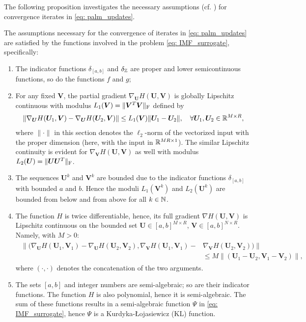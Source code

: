The following proposition investigates the necessary assumptions (cf. \cite[Asm. 1 and Asm. 2]{bolte2014proximal}) for convergence iterates in \eqref{eq: palm_updates}.
\begin{prop}\label{prop: assumptions}
    The assumptions necessary for the convergence of iterates in \eqref{eq: palm_updates} are satisfied by the functions involved in the problem \eqref{eq: IMF_surrogate}, specifically:
    \begin{enumerate}
        \item The indicator functions $\delta_{[a,b]}$ and $\delta_\mathbb Z$ are proper and lower semicontinuous functions, so do the functions $f$ and $g$;
        \item For any fixed $\bm V$, the partial gradient $\nabla_{\bm U} H(\bm U, \bm V)$ is globally Lipschitz continuous with modulus $L_1(\bm V) = \|\bm V^T \bm V\|_{\rm F}$ defined by
        \begin{equation*}
            \|\nabla_{\bm U} H(\bm U_1, \bm V) - \nabla_{\bm U} H(\bm U_2, \bm V)\| \leq L_1(\bm V) \|\bm U_1 - \bm U_2\|, \quad \forall \bm U_1,\bm U_2 \in \mathbb{R}^{M\times R},
        \end{equation*}
        where $\|\cdot\|$ in this section denotes the $\ell_2$-norm of the vectorized input with the proper dimension (here, with the input in $\mathbb{R}^{MR\times 1}$).
        The similar Lipschitz continuity is evident for $\nabla_{\bm V} H(\bm U, \bm V)$ as well with modulus $L_2(\bm U) = \|\bm U \bm U^T\|_{\rm F}$.
        \item The sequences $\bm U^k$ and $\bm V^k$ are bounded due to the indicator functions $\delta_{[a,b]}$ with bounded $a$ and $b$. Hence the moduli $L_1(\bm V^k)$ and $L_2(\bm U^k)$ are bounded from below and from above for all $k\in\mathbb N$.
        \item The function $H$ is twice differentiable, hence, its full gradient $\nabla H(\bm U,\bm V)$ is Lipschitz continuous on the bounded set $\bm U \in [a,b]^{M\times R}$, $\bm V \in [a,b]^{N\times R}$. Namely, with $M > 0$:
        \begin{align}
            \begin{split}
                \|(\nabla_{\bm U} H(\bm U_1, \bm V_1) - \nabla_{\bm U} H(\bm U_2, \bm V_2), \nabla_{\bm V} H(\bm U_1, \bm V_1) - &\nabla_{\bm V} H(\bm U_2, \bm V_2))\| \\
                &\leq M \|(\bm U_1 - \bm U_2, \bm V_1 - \bm V_2)\|,
            \end{split}
        \end{align}
        where $(\cdot,\cdot)$ denotes the concatenation of the two arguments.
        \item The sets $[a,b]$ and integer numbers are semi-algebraic; so are their indicator functions. The function $H$ is also polynomial, hence it is semi-algebraic. The sum of these functions results in a semi-algebraic function $\Psi$ in \eqref{eq: IMF_surrogate}, hence $\Psi$ is a Kurdyka-Łojasiewicz (KL) function.
    \end{enumerate}
\end{prop}
